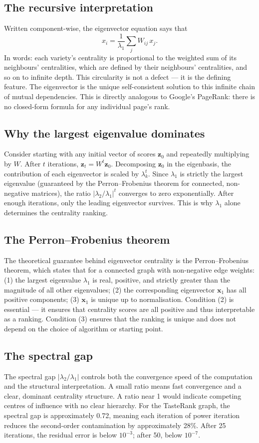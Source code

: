 \documentclass[11pt]{article}
\begin{document}
\subsection{The recursive interpretation}
Written component-wise, the eigenvector equation says that
\[
x_i = \frac{1}{\lambda_1} \sum_j W_{ij}\, x_j.
\]
In words: each variety's centrality is proportional to the weighted sum of its neighbours' centralities, which are defined by their neighbours' centralities, and so on to infinite depth. This circularity is not a defect --- it is the defining feature. The eigenvector is the unique self-consistent solution to this infinite chain of mutual dependencies. This is directly analogous to Google's PageRank: there is no closed-form formula for any individual page's rank.

\subsection{Why the largest eigenvalue dominates}
Consider starting with any initial vector of scores $\mathbf{z}_0$ and repeatedly multiplying by $W$. After $t$ iterations, $\mathbf{z}_t = W^t \mathbf{z}_0$. Decomposing $\mathbf{z}_0$ in the eigenbasis, the contribution of each eigenvector is scaled by $\lambda_k^t$. Since $\lambda_1$ is strictly the largest eigenvalue (guaranteed by the Perron--Frobenius theorem for connected, non-negative matrices), the ratio $|\lambda_2 / \lambda_1|^t$ converges to zero exponentially. After enough iterations, only the leading eigenvector survives. This is why $\lambda_1$ alone determines the centrality ranking.

\subsection{The Perron--Frobenius theorem}
The theoretical guarantee behind eigenvector centrality is the Perron--Frobenius theorem, which states that for a connected graph with non-negative edge weights: (1) the largest eigenvalue $\lambda_1$ is real, positive, and strictly greater than the magnitude of all other eigenvalues; (2) the corresponding eigenvector $\mathbf{x}_1$ has all positive components; (3) $\mathbf{x}_1$ is unique up to normalisation. Condition (2) is essential --- it ensures that centrality scores are all positive and thus interpretable as a ranking. Condition (3) ensures that the ranking is unique and does not depend on the choice of algorithm or starting point.

\subsection{The spectral gap}
The spectral gap $|\lambda_2 / \lambda_1|$ controls both the convergence speed of the computation and the structural interpretation. A small ratio means fast convergence and a clear, dominant centrality structure. A ratio near 1 would indicate competing centres of influence with no clear hierarchy. For the TasteRank graph, the spectral gap is approximately 0.72, meaning each iteration of power iteration reduces the second-order contamination by approximately 28\%. After 25 iterations, the residual error is below $10^{-3}$; after 50, below $10^{-7}$.
\end{document}
